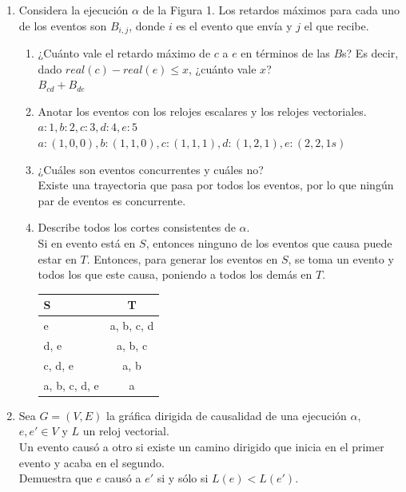 \documentclass[12pt,a4paper]{report}
\begin{document}
	\begin{enumerate}
		\item {
			Considera la ejecución $\alpha$ de la Figura 1. Los retardos máximos
			para cada uno de los eventos son $B_{i, j}$, donde $i$ es el evento
			que envía y $j$ el que recibe.
			\begin{enumerate}
				\item {
					¿Cuánto vale el retardo máximo de $c$ a $e$ en términos de
					las $B$s? Es decir, dado $real(c)-real(e) \leq x$, ¿cuánto
					vale $x$?\\
					$B_{cd} + B_{de}$
				}

				\item {
					Anotar los eventos con los relojes escalares y los relojes
					vectoriales.\\
					$a:1, b:2, c:3, d:4, e:5$\\
					$a:(1, 0, 0), b:(1, 1, 0), c:(1, 1, 1), d:(1, 2, 1), e:(2, 2, 1s)$
				}

				\item {
					¿Cuáles son eventos concurrentes y cuáles no?\\
					Existe una trayectoria que pasa por todos los eventos, por
					lo que ningún par de eventos es concurrente.
				}

				\item {
					Describe todos los cortes consistentes de $\alpha$.\\
					Si en evento está en $S$, entonces ninguno de los eventos
					que causa puede estar en $T$. Entonces, para generar los
					eventos en $S$, se toma un evento y todos los que este causa,
					poniendo a todos los demás en $T$.\\
					\begin{tabular}{| l | c |}
						\hline
  						S & T \\ \hline
  						e & a, b, c, d \\ \hline
  						d, e & a, b, c \\ \hline
						c, d, e & a, b \\ \hline
						a, b, c, d, e & a \\
						\hline
					\end{tabular}
				}
			\end{enumerate}
		}

		\item {
			Sea $G = (V, E)$ la gráfica dirigida de causalidad de una ejecución
			$\alpha$, $e, e' \in V$ y $L$ un reloj vectorial.\\
			Un evento causó a otro si existe un camino dirigido que inicia en
			el primer evento y acaba en el segundo.\\
			Demuestra que $e$ causó a $e'$ si y sólo si $L(e) < L(e')$.
		}


\end{enumerate}
\end{document}
